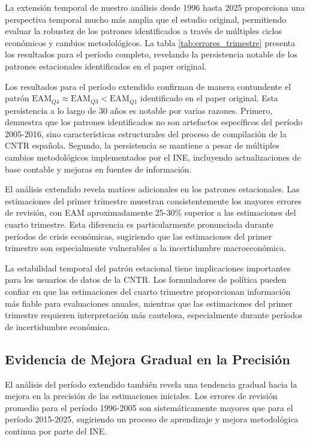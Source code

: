 \documentclass[12pt,a4paper]{article}
\begin{document}
La extensión temporal de nuestro análisis desde 1996 hasta 2025 proporciona una perspectiva temporal mucho más amplia que el estudio original, permitiendo evaluar la robustez de los patrones identificados a través de múltiples ciclos económicos y cambios metodológicos. La tabla \ref{tab:errores_trimestre} presenta los resultados para el período completo, revelando la persistencia notable de los patrones estacionales identificados en el paper original.



Los resultados para el período extendido confirman de manera contundente el patrón $\text{EAM}_{Q4} \approx \text{EAM}_{Q3} < \text{EAM}_{Q1}$ identificado en el paper original. Esta persistencia a lo largo de 30 años es notable por varias razones. Primero, demuestra que los patrones identificados no son artefactos específicos del período 2005-2016, sino características estructurales del proceso de compilación de la CNTR española. Segundo, la persistencia se mantiene a pesar de múltiples cambios metodológicos implementados por el INE, incluyendo actualizaciones de base contable y mejoras en fuentes de información.

El análisis extendido revela matices adicionales en los patrones estacionales. Las estimaciones del primer trimestre muestran consistentemente los mayores errores de revisión, con EAM aproximadamente 25-30\% superior a las estimaciones del cuarto trimestre. Esta diferencia es particularmente pronunciada durante períodos de crisis económicas, sugiriendo que las estimaciones del primer trimestre son especialmente vulnerables a la incertidumbre macroeconómica.

La estabilidad temporal del patrón estacional tiene implicaciones importantes para los usuarios de datos de la CNTR. Los formuladores de política pueden confiar en que las estimaciones del cuarto trimestre proporcionan información más fiable para evaluaciones anuales, mientras que las estimaciones del primer trimestre requieren interpretación más cautelosa, especialmente durante períodos de incertidumbre económica.

\subsection{Evidencia de Mejora Gradual en la Precisión}

El análisis del período extendido también revela una tendencia gradual hacia la mejora en la precisión de las estimaciones iniciales. Los errores de revisión promedio para el período 1996-2005 son sistemáticamente mayores que para el período 2015-2025, sugiriendo un proceso de aprendizaje y mejora metodológica continua por parte del INE.
\end{document}
